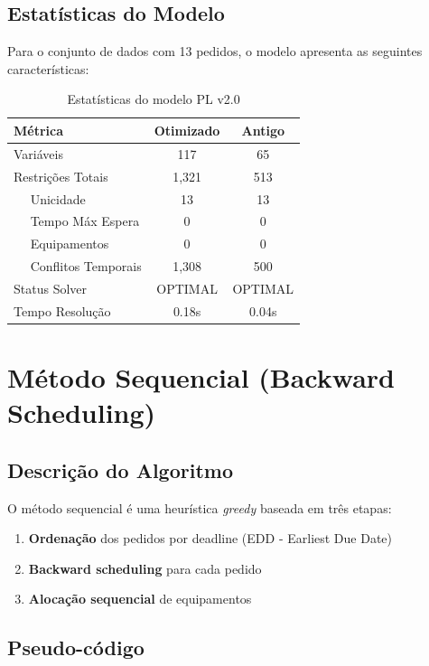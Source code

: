 \documentclass[12pt,a4paper]{article}
\theoremstyle{definition}
\begin{document}
\subsection{Estatísticas do Modelo}

Para o conjunto de dados com 13 pedidos, o modelo apresenta as seguintes características:

\begin{table}[H]
\centering
\begin{tabular}{@{}lcc@{}}
\toprule
\textbf{Métrica} & \textbf{Otimizado} & \textbf{Antigo} \\
\midrule
Variáveis & 117 & 65 \\
Restrições Totais & 1,321 & 513 \\
$\quad$ Unicidade & 13 & 13 \\
$\quad$ Tempo Máx Espera & 0 & 0 \\
$\quad$ Equipamentos & 0 & 0 \\
$\quad$ Conflitos Temporais & 1,308 & 500 \\
\midrule
Status Solver & OPTIMAL & OPTIMAL \\
Tempo Resolução & 0.18s & 0.04s \\
\bottomrule
\end{tabular}
\caption{Estatísticas do modelo PL v2.0}
\label{tab:estatisticas_modelo}
\end{table}

\section{Método Sequencial (Backward Scheduling)}

\subsection{Descrição do Algoritmo}

O método sequencial é uma heurística \textit{greedy} baseada em três etapas:

\begin{enumerate}
    \item \textbf{Ordenação} dos pedidos por deadline (EDD - Earliest Due Date)
    \item \textbf{Backward scheduling} para cada pedido
    \item \textbf{Alocação sequencial} de equipamentos
\end{enumerate}

\subsection{Pseudo-código}
\end{document}
